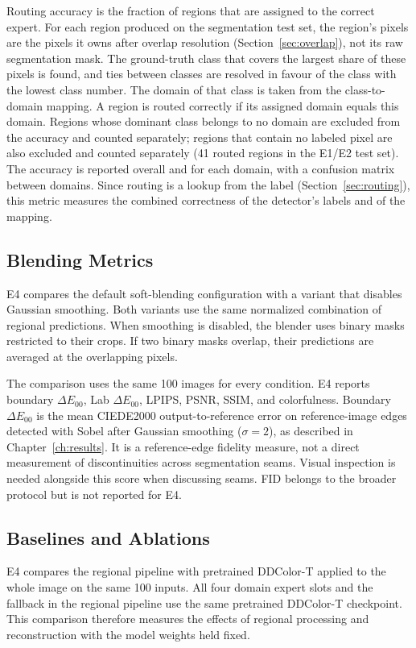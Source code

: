 \documentclass{FastFyp}
\begin{document}
Routing accuracy is the fraction of regions that are assigned to the correct expert. For each region produced on the segmentation test set, the region's pixels are the pixels it owns after overlap resolution (Section~\ref{sec:overlap}), not its raw segmentation mask. The ground-truth class that covers the largest share of these pixels is found, and ties between classes are resolved in favour of the class with the lowest class number. The domain of that class is taken from the class-to-domain mapping. A region is routed correctly if its assigned domain equals this domain. Regions whose dominant class belongs to no domain are excluded from the accuracy and counted separately; regions that contain no labeled pixel are also excluded and counted separately (41 routed regions in the E1/E2 test set). The accuracy is reported overall and for each domain, with a confusion matrix between domains. Since routing is a lookup from the label (Section~\ref{sec:routing}), this metric measures the combined correctness of the detector's labels and of the mapping.
\subsection{Blending Metrics}

E4 compares the default soft-blending configuration with a variant that
disables Gaussian smoothing. Both variants use the same normalized
combination of regional predictions. When smoothing is disabled, the
blender uses binary masks restricted to their crops. If two binary masks
overlap, their predictions are averaged at the overlapping pixels.

The comparison uses the same 100 images for every condition. E4 reports boundary $\Delta E_{00}$, Lab $\Delta E_{00}$, LPIPS, PSNR, SSIM, and colorfulness. Boundary $\Delta E_{00}$ is the mean CIEDE2000 output-to-reference error on reference-image edges detected with Sobel after Gaussian smoothing ($\sigma=2$), as described in Chapter~\ref{ch:results}. It is a reference-edge fidelity measure, not a direct measurement of discontinuities across segmentation seams. Visual inspection is needed alongside this score when discussing seams. FID belongs to the broader protocol but is not reported for E4.

\subsection{Baselines and Ablations}

E4 compares the regional pipeline with pretrained DDColor-T applied to
the whole image on the same 100 inputs. All four domain expert slots and
the fallback in the regional pipeline use the same pretrained DDColor-T
checkpoint. This comparison therefore measures the effects of regional
processing and reconstruction with the model weights held fixed.
\end{document}
